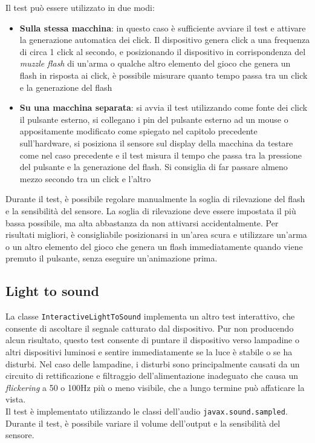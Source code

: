 Il test può essere utilizzato in due modi:\begin{itemize}
	\item \textbf{Sulla stessa macchina}: in questo caso è sufficiente avviare il test e attivare la generazione automatica dei click. Il dispositivo genera click a una frequenza di circa 1 click al secondo, e posizionando il dispositivo in corrispondenza del \textit{muzzle flash} di un'arma o qualche altro elemento del gioco che genera un flash in risposta ai click, è possibile misurare quanto tempo passa tra un click e la generazione del flash
	\item \textbf{Su una macchina separata}: si avvia il test utilizzando come fonte dei click il pulsante esterno, si collegano i pin del pulsante esterno ad un mouse o appositamente modificato come spiegato nel capitolo precedente sull'hardware, si posiziona il sensore sul display della macchina da testare come nel caso precedente e il test misura il tempo che passa tra la pressione del pulsante e la generazione del flash. Si consiglia di far passare almeno mezzo secondo tra un click e l'altro
\end{itemize}

Durante il test, è possibile regolare manualmente la soglia di rilevazione del flash e la sensibilità del sensore. La soglia di rilevazione deve essere impostata il più bassa possibile, ma alta abbastanza da non attivarsi accidentalmente. Per risultati migliori, è consigliabile posizionarsi in un'area scura e utilizzare un'arma o un altro elemento del gioco che genera un flash immediatamente quando viene premuto il pulsante, senza eseguire un'animazione prima.

\subsection{Light to sound}
La classe \texttt{InteractiveLightToSound} implementa un altro test interattivo, che consente di ascoltare il segnale catturato dal dispositivo. Pur non producendo alcun risultato, questo test consente di puntare il dispositivo verso lampadine o altri dispositivi luminosi e sentire immediatamente se la luce è stabile o se ha disturbi. Nel caso delle lampadine, i disturbi sono principalmente causati da un circuito di rettificazione e filtraggio dell'alimentazione inadeguato che causa un \textit{flickering} a 50 o 100Hz più o meno visibile, che a lungo termine può affaticare la vista.\\
Il test è implementato utilizzando le classi dell'audio \texttt{javax.sound.sampled}. Durante il test, è possibile variare il volume dell'output e la sensibilità del sensore.

